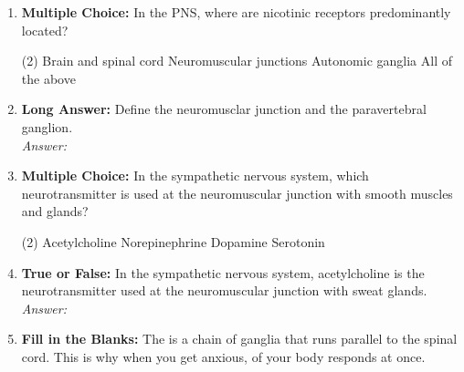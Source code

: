 \begin{enumerate}[label=\textbf{Q3.4.\arabic*}]
    \item \textbf{Multiple Choice:} In the PNS, where are nicotinic receptors predominantly located? 
            \begin{tasks}[label=\textcolor{\documentTheme}{(\Alph*)}, item-format=\color{\documentTheme}, label-width=1.5em, item-indent=1.7em](2)
                \task Brain and spinal cord
                \task Neuromuscular junctions
                \task Autonomic ganglia
                \task All of the above
            \end{tasks}

    \item \textbf{Long Answer:} Define the neuromusclar junction and the paravertebral ganglion. \\
        \textit{Answer:} \\[2cm] %

        \item \textbf{Multiple Choice:} In the sympathetic nervous system, which neurotransmitter is used at the neuromuscular junction with smooth muscles and glands?
        \begin{tasks}[label=\textcolor{\documentTheme}{(\Alph*)}, item-format=\color{\documentTheme}, label-width=1.5em, item-indent=1.7em](2)
            \task Acetylcholine
            \task Norepinephrine
            \task Dopamine
            \task Serotonin
        \end{tasks}

    \item \textbf{True or False:} In the sympathetic nervous system, acetylcholine is the neurotransmitter used at the neuromuscular junction with sweat glands. \\
        \textit{Answer:} %

    \item \textbf{Fill in the Blanks:} The \underline{\hspace{3cm}} is a chain of ganglia that runs parallel to the spinal cord. This is why when you get anxious, \underline{\hspace{3cm}} of your body responds at once.


\end{enumerate}
